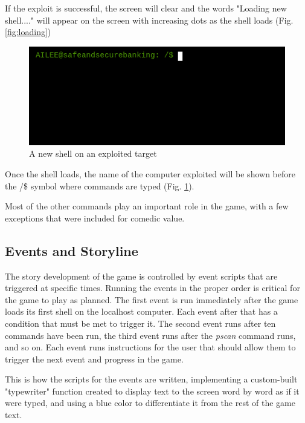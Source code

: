 \documentclass[conference]{IEEEtran}
\begin{document}
If the exploit is successful, the screen will clear and the words "Loading new shell...." will appear on the screen with increasing dots as the shell loads (Fig. \ref{fig:loading})

\begin{figure}[h]
	\centerline{\includegraphics[scale=2]{access-granted}}
	\caption{A new shell on an exploited target}
	\label{fig:access}
\end{figure}

Once the shell loads, the name of the computer exploited will be shown before the /\$ symbol where commands are typed (Fig. \ref{fig:access}).

Most of the other commands play an important role in the game, with a few exceptions that were included for comedic value.

\subsection{Events and Storyline}

The story development of the game is controlled by event scripts that are triggered at specific times. Running the events in the proper order is critical for the game to play as planned. The first event is run immediately after the game loads its first shell on the localhost computer. Each event after that has a condition that must be met to trigger it. The second event runs after ten commands have been run, the third event runs after the \textit{pscan} command runs, and so on. Each event runs instructions for the user that should allow them to trigger the next event and progress in the game.



This is how the scripts for the events are written, implementing a custom-built "typewriter" function created to display text to the screen word by word as if it were typed, and using a blue color to differentiate it from the rest of the game text. 
\end{document}
